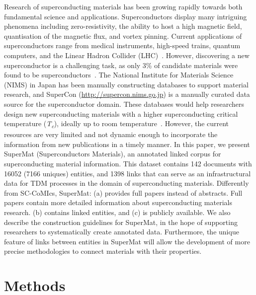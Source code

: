 \documentclass[fleqn,10pt]{wlscirep}
\begin{document}
Research of superconducting materials has been growing rapidly towards both fundamental science and applications. Superconductors display many intriguing phenomena including zero-resistivity, the ability to host a high magnetic field, quantisation of the magnetic flux, and vortex pinning.  
Current applications of superconductors range from medical instruments, high-speed trains, quantum computers, and the Linear Hadron Collider (LHC)~\cite{PhilippeBook, Kizu2010ConstructionOT, Cardani2017NewAO}. 
However, discovering a new superconductor is a challenging task, as only 3\% of candidate materials were found to be superconductors~\cite{Konno2018DeepLO}.
The National Institute for Materials Science (NIMS) in Japan has been manually constructing databases to support material research, and SuperCon (\url{http://supercon.nims.go.jp}) is a manually curated data source for the superconductor domain.
These databases would help researchers design new superconducting materials with a higher superconducting critical temperature (\textit{T\textsubscript{c}}), ideally up to room temperature~\cite{Hamlin2019SuperconductivityNR,stanev2017machine}.
However, the current resources are very limited and not dynamic enough to incorporate the information from new publications in a timely manner. 
In this paper, we present SuperMat (Superconductors Materials), an annotated linked corpus for superconducting material information. 
This dataset contains 142 documents with 16052 (7166 uniques) entities, and 1398 links that can serve as an infrastructural data for TDM processes in the domain of superconducting materials. 
Differently from SC-CoMIcs, SuperMat: (a) provides full papers instead of abstracts. Full papers contain more detailed information about superconducting materials research. (b) contains linked entities, and (c) is publicly available. 
We also describe the construction guidelines for SuperMat, in the hope of supporting researchers to systematically create annotated data.
Furthermore, the unique feature of links between entities in SuperMat will allow the development of more precise methodologies to connect materials with their properties.

\label{sec:method}
\section*{Methods}

\label{content-acquisition}
\end{document}
